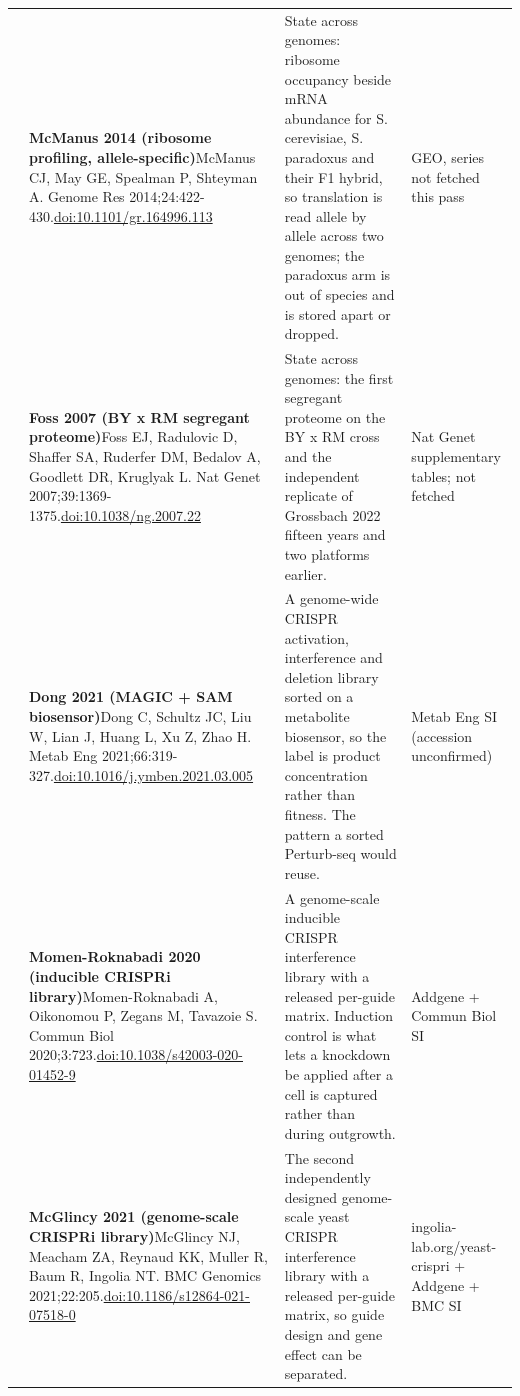 \begin{landscape}
\begin{longtable}{@{}r@{\hspace{4pt}} L{86mm} L{92mm} L{62mm}@{}}
 & \textbf{McManus 2014 (ribosome profiling, allele-specific)}\newline McManus CJ, May GE, Spealman P, Shteyman A. Genome Res 2014;24:422-430.\newline \href{https://doi.org/10.1101/gr.164996.113}{doi:10.1101/\allowbreak gr.164996.113} & State across genomes: ribosome occupancy beside mRNA abundance for S. cerevisiae, S. paradoxus and their F1 hybrid, so translation is read allele by allele across two genomes; the paradoxus arm is out of species and is stored apart or dropped. & GEO, series not fetched this pass \\
 & \textbf{Foss 2007 (BY x RM segregant proteome)}\newline Foss EJ, Radulovic D, Shaffer SA, Ruderfer DM, Bedalov A, Goodlett DR, Kruglyak L. Nat Genet 2007;39:1369-1375.\newline \href{https://doi.org/10.1038/ng.2007.22}{doi:10.1038/\allowbreak ng.2007.22} & State across genomes: the first segregant proteome on the BY x RM cross and the independent replicate of Grossbach 2022 fifteen years and two platforms earlier. & Nat Genet supplementary tables; not fetched \\
 & \textbf{Dong 2021 (MAGIC + SAM biosensor)}\newline Dong C, Schultz JC, Liu W, Lian J, Huang L, Xu Z, Zhao H. Metab Eng 2021;66:319-327.\newline \href{https://doi.org/10.1016/j.ymben.2021.03.005}{doi:10.1016/\allowbreak j.ymben.2021.03.005} & A genome-wide CRISPR activation, interference and deletion library sorted on a metabolite biosensor, so the label is product concentration rather than fitness. The pattern a sorted Perturb-seq would reuse. & Metab Eng SI (accession unconfirmed) \\
 & \textbf{Momen-Roknabadi 2020 (inducible CRISPRi library)}\newline Momen-Roknabadi A, Oikonomou P, Zegans M, Tavazoie S. Commun Biol 2020;3:723.\newline \href{https://doi.org/10.1038/s42003-020-01452-9}{doi:10.1038/\allowbreak s42003-020-01452-9} & A genome-scale inducible CRISPR interference library with a released per-guide matrix. Induction control is what lets a knockdown be applied after a cell is captured rather than during outgrowth. & Addgene + Commun Biol SI \\
 & \textbf{McGlincy 2021 (genome-scale CRISPRi library)}\newline McGlincy NJ, Meacham ZA, Reynaud KK, Muller R, Baum R, Ingolia NT. BMC Genomics 2021;22:205.\newline \href{https://doi.org/10.1186/s12864-021-07518-0}{doi:10.1186/\allowbreak s12864-021-07518-0} & The second independently designed genome-scale yeast CRISPR interference library with a released per-guide matrix, so guide design and gene effect can be separated. & ingolia-lab.org/\allowbreak yeast-crispri + Addgene + BMC SI \\

\end{longtable}
\end{landscape}
